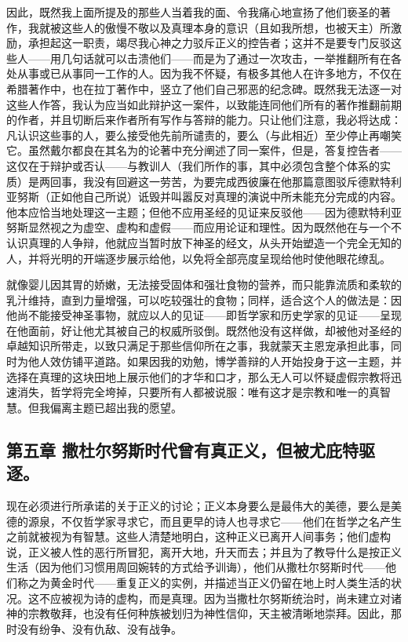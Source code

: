 因此，既然我上面所提及的那些人当着我的面、令我痛心地宣扬了他们亵圣的著作，我就被这些人的傲慢不敬以及真理本身的意识（且如我所想，也被天主）所激励，承担起这一职责，竭尽我心神之力驳斥正义的控告者；这并不是要专门反驳这些人——用几句话就可以击溃他们——而是为了通过一次攻击，一举推翻所有在各处从事或已从事同一工作的人。因为我不怀疑，有极多其他人在许多地方，不仅在希腊著作中，也在拉丁著作中，竖立了他们自己邪恶的纪念碑。既然我无法逐一对这些人作答，我认为应当如此辩护这一案件，以致能连同他们所有的著作推翻前期的作者，并且切断后来作者所有写作与答辩的能力。只让他们注意，我必将达成：凡认识这些事的人，要么接受他先前所谴责的，要么（与此相近）至少停止再嘲笑它。虽然戴尔都良在其名为的论著中充分阐述了同一案件，但是，答复控告者——这仅在于辩护或否认——与教训人（我们所作的事，其中必须包含整个体系的实质）是两回事，我没有回避这一劳苦，为要完成西彼廉在他那篇意图驳斥德默特利亚努斯（正如他自己所说）诋毁并叫嚣反对真理的演说中所未能充分完成的内容。他本应恰当地处理这一主题；但他不应用圣经的见证来反驳他——因为德默特利亚努斯显然视之为虚空、虚构和虚假——而应用论证和理性。因为既然他在与一个不认识真理的人争辩，他就应当暂时放下神圣的经文，从头开始塑造一个完全无知的人，并将光明的开端逐步展示给他，以免将全部亮度呈现给他时使他眼花缭乱。\par

就像婴儿因其胃的娇嫩，无法接受固体和强壮食物的营养，而只能靠流质和柔软的乳汁维持，直到力量增强，可以吃较强壮的食物；同样，适合这个人的做法是：因他尚不能接受神圣事物，就应以人的见证——即哲学家和历史学家的见证——呈现在他面前，好让他尤其被自己的权威所驳倒。既然他没有这样做，却被他对圣经的卓越知识所带走，以致只满足于那些信仰所在之事，我就蒙天主恩宠承担此事，同时为他人效仿铺平道路。如果因我的劝勉，博学善辩的人开始投身于这一主题，并选择在真理的这块田地上展示他们的才华和口才，那么无人可以怀疑虚假宗教将迅速消失，哲学将完全垮掉，只要所有人都被说服：唯有这才是宗教和唯一的真智慧。但我偏离主题已超出我的愿望。\par


\subsection{第五章  撒杜尔努斯时代曾有真正义，但被尤庇特驱逐。}

现在必须进行所承诺的关于正义的讨论；正义本身要么是最伟大的美德，要么是美德的源泉，不仅哲学家寻求它，而且更早的诗人也寻求它——他们在哲学之名产生之前就被视为有智慧。这些人清楚地明白，这种正义已离开人间事务；他们虚构说，正义被人性的恶行所冒犯，离开大地，升天而去；并且为了教导什么是按正义生活（因为他们习惯用周回婉转的方式给予训诲），他们从撒杜尔努斯时代——他们称之为黄金时代——重复正义的实例，并描述当正义仍留在地上时人类生活的状况。这不应被视为诗的虚构，而是真理。因为当撒杜尔努斯统治时，尚未建立对诸神的宗教敬拜，也没有任何种族被划归为神性信仰，天主被清晰地崇拜。因此，那时没有纷争、没有仇敌、没有战争。\par

